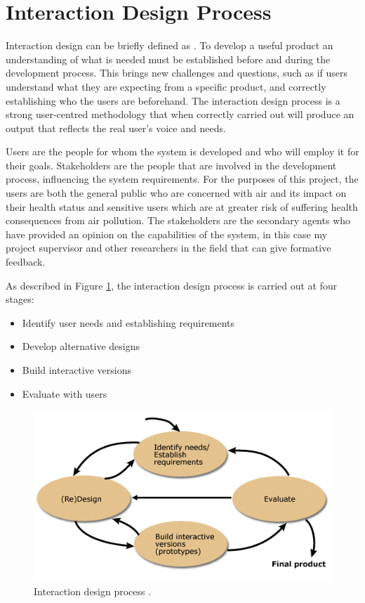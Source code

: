 \section{Interaction Design Process}
Interaction design can be briefly defined as  \cite{Sharp2011}. To develop a useful product an understanding of what is needed must be established before and during the development process. This brings new challenges and questions, such as if users understand what they are expecting from a specific product, and correctly establishing who the users are beforehand. The interaction design process is a strong user-centred methodology that when correctly carried out will produce an output that reflects the real user's voice and needs. 

Users are the people for whom the system is developed and who will employ it for their goals. Stakeholders are the people that are involved in the development process, influencing the system requirements. For the purposes of this project, the users are both the general public who are concerned with air and its impact on their health status and sensitive users which are at greater risk of suffering health consequences from air pollution. The stakeholders are the secondary agents who have provided an opinion on the capabilities of the system, in this case my project supervisor and other researchers in the field that can give formative feedback.

As described in Figure \ref{fig:interaction_design}, the interaction design process is carried out at four stages: \begin{itemize}
  \item Identify user needs and establishing requirements
  \item Develop alternative designs
  \item Build interactive versions
  \item Evaluate with users
\end{itemize}

\begin{figure}[h]
  \includegraphics[scale=.8]{images/interatcion-design.png}
  \caption[Interaction design process]{Interaction design process \cite{Sharp2011}.}
  \label{fig:interaction_design}
\end{figure}

